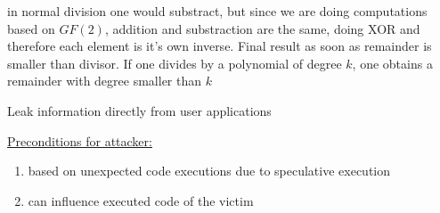 \documentclass[landscape, a4paper]{article}
\begin{document}
\begin{minipage}[t]{0.198\pagewidth}
\begin{betterlist}
\begin{betterlist}
		\end{betterlist}
	\end{betterlist}
	\begin{betterlist}
		\item in normal division one would substract, but since we are doing computations based on $GF(2)$, addition and substraction are the same, doing XOR and therefore each element is it's own inverse. Final result as soon as remainder is smaller than divisor. If one divides by a polynomial of degree $k$, one obtains a remainder with degree smaller than $k$
	\end{betterlist}
	\begin{betterlist}
		\item Leak information directly from user applications
		\item \underline{Preconditions for attacker:}
		\begin{enumerate}
			\item based on unexpected code executions due to speculative execution
			\item can influence executed code of the victim
\end{enumerate}
\end{betterlist}
\end{minipage}
\end{document}

